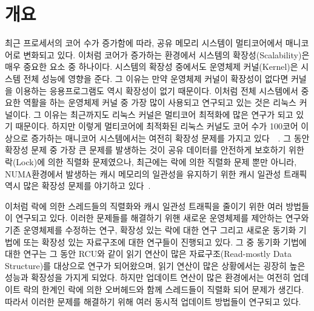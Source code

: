 \section{개요} \label{sec:intro}

최근 프로세서의 코어 수가 증가함에 따라, 공유 메모리 시스템이 멀티코어에서 매니코어로 변화되고 있다.
이처럼 코어가 증가하는 환경에서 시스템의 확장성(Scalability)은 매우 중요한 요소 중 하나이다.
시스템의 확장성 중에서도 운영체제 커널(Kernel)은 시스템 전체 성능에 영향을 준다.
그 이유는 만약 운영체제 커널이 확장성이 없다면 커널을 이용하는 응용프로그램도 역시 확장성이 없기 때문이다.
이처럼 전체 시스템에서 중요한 역활을 하는 운영체제 커널 중 가장 많이 사용되고 연구되고 있는 것은 리눅스 커널이다. 
그 이유는 최근까지도 리눅스 커널은 멀티코어 최적화에 많은 연구가 되고 있기 때문이다. 
하지만 이렇게 멀티코어에 최적화된 리눅스 커널도 코어 수가 100코어 이상으로 증가하는 
매니코어 시스템에서는 여전히 확장성 문제를 가지고 있다~\cite{SilasBoydWickizer2010LinuxScales48}~\cite{Changwoo2016UMSF}.
그 동안 확장성 문제 중 가장 큰 문제를 발생하는 것이 공유 데이터를 안전하게 보호하기 
위한 락(Lock)에 의한 직렬화 문제였으나,
최근에는 락에 의한 직렬화 문제 뿐만 아니라, NUMA환경에서 발생하는 캐시 메모리의 일관성을 
유지하기 위한 캐시 일관성 트래픽 역시 많은 확장성 문제를
야기하고 있다\cite{mckenney2011parallel}~\cite{SilasBoydWickizerPth}.

이처럼 락에 의한 스레드들의 직렬화와 캐시 일관성 트래픽을 줄이기 위한 여러 방법들이 연구되고
있다.
이러한 문제들를 해결하기 위핸 새로운 운영체제를 제안하는 연구와 
기존 운영체제를 수정하는 연구, 확장성 있는 락에 대한 연구 그리고 새로운 동기화 기법에 
또는 확장성 있는 자료구조에 대한 연구들이 진행되고 있다.
그 중 동기화 기법에 대한 연구는 그 동안 RCU와 같이 읽기 연산이 많은 자료구조(Read-mostly Data Structure)를 
대상으로 연구가 되어왔으며, 읽기 연산이 많은 상황에서는 굉장히 높은 성능과 확장성을 가지게 되었다. 
하지만 업데이트 연산이 많은 환경에서는 여전히 업데이트 락의 한계인 
락에 의한 오버헤드와 함께 스레드들이 직렬화 되어 문제가 생긴다.  
따라서 이러한 문제를 해결하기 위해 여러 동시적 업데이트 방법들이 연구되고 있다.

